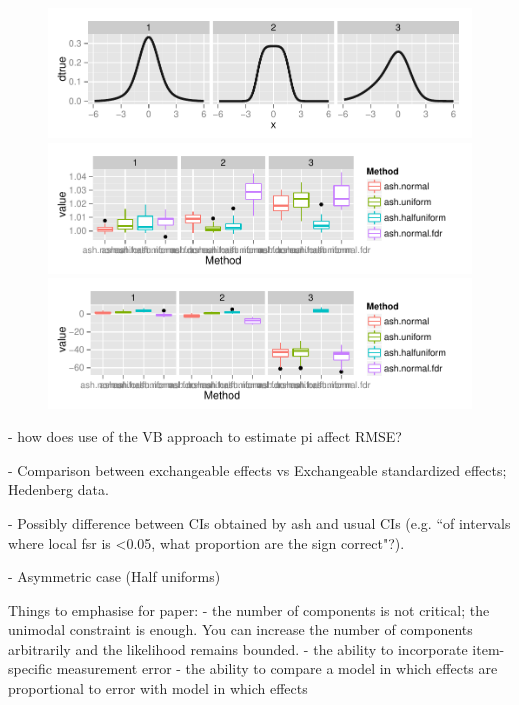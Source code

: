 \documentclass[11pt]{article}
\begin{document}
\begin{figure}[!ht] \label{fig:rmse_loglik_boxplot}
\begin{center}
\includegraphics[width=6.5in]{Rcode/figures/simABC_egdens.pdf}
\includegraphics[width=6.5in]{Rcode/figures/rmse_boxplot.pdf}
\includegraphics[width=6.5in]{Rcode/figures/loglik_boxplot.pdf}
\end{center}
\caption{}
\end{figure}

- how does use of the VB approach to estimate pi affect RMSE?

- Comparison between exchangeable effects vs Exchangeable standardized effects; Hedenberg data. 

- Possibly difference between CIs obtained by ash and usual CIs (e.g. ``of intervals where local fsr is <0.05, what proportion are the sign correct"?).


- Asymmetric case (Half uniforms)

Things to emphasise for paper:
- the number of components is not critical; the unimodal constraint is enough. You can increase the number of components arbitrarily and the likelihood remains bounded.
- the ability to incorporate item-specific measurement error
- the ability to compare a model in which effects are proportional to error
with model in which effects 
\end{document}
